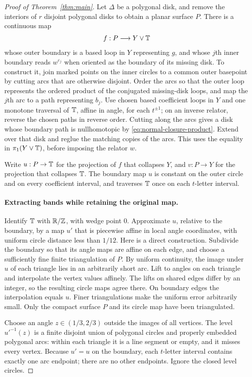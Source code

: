 \begin{proof}[Proof of Theorem~\ref{thm:main}]
Let $\Delta$ be a polygonal disk, and remove the interiors of $r$ disjoint
polygonal disks to obtain a planar surface $P$. There is a continuous map
\[
 f:P\longrightarrow Y\vee\mathbb T
\]
whose outer boundary is a based loop in $Y$ representing $g$, and whose
$j$th inner boundary reads $w^{\varepsilon_j}$ when oriented as the
boundary of its missing disk. To construct it, join marked points on the
inner circles to a common outer basepoint by cutting arcs that are otherwise
disjoint. Order the arcs so that the outer loop represents the ordered
product of the conjugated missing-disk loops, and map the $j$th arc to a
path representing $b_j$. Use chosen based coefficient loops in $Y$ and
one monotone traversal of $\mathbb T$, affine in angle, for each $t^{\pm1}$;
on an inverse relator, reverse the chosen paths in reverse order.
Cutting along the arcs gives a
disk whose boundary path is nullhomotopic by
\eqref{eq:normal-closure-product}. Extend over that disk and reglue the
matching copies of the arcs. This uses the equality in
$\pi_1(Y\vee\mathbb T)$, before imposing the relator $w$.

Write $u:P\to\mathbb T$ for the projection of $f$ that collapses $Y$, and
$v:P\to Y$ for the projection that collapses $\mathbb T$. The boundary map $u$
is constant on the outer circle and on every coefficient interval, and
traverses $\mathbb T$ once on each $t$-letter interval.

\paragraph{Extracting bands while retaining the original map.}
Identify $\mathbb T$ with $\mathbb R/\mathbb Z$, with wedge point $0$. Approximate
$u$, relative to the boundary, by a map $u'$ that is piecewise affine in
local angle coordinates, with uniform circle distance less than $1/12$.
Here is a direct construction. Subdivide the boundary so that its angle
maps are affine on each edge, and choose a sufficiently fine finite
triangulation of $P$. By uniform continuity, the image under $u$ of each
triangle lies in an arbitrarily short arc. Lift to angles on each triangle
and interpolate the vertex values affinely. The lifts on shared edges
differ by an integer, so the resulting circle maps agree there. On boundary
edges the interpolation equals $u$. Finer triangulations make the uniform
error arbitrarily small. Only the compact surface $P$ and its circle map
have been triangulated.

Choose an angle $z\in(1/3,2/3)$ outside the images of all vertices. The
level $u'^{-1}(z)$ is a finite disjoint union of polygonal circles and
properly embedded polygonal arcs: within each triangle it is a line
segment or empty, and it misses every vertex. Because $u'=u$ on the
boundary, each $t$-letter interval contains exactly one arc endpoint;
there are no other endpoints. Ignore the closed level circles.


\end{proof}
